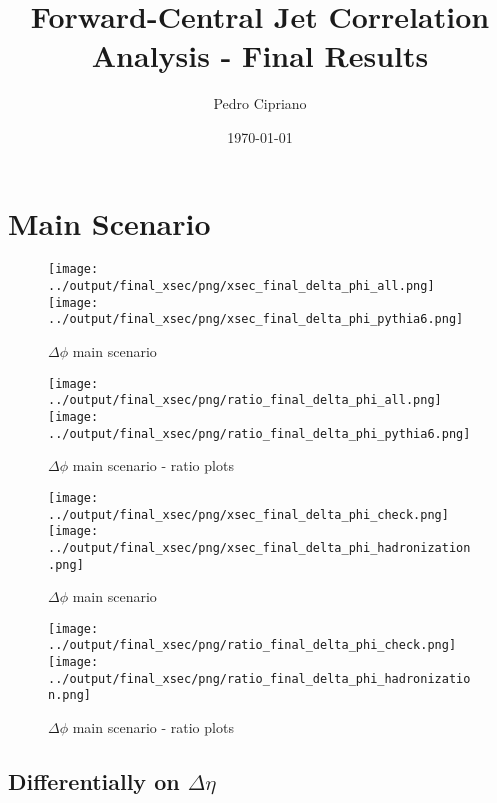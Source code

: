 \documentclass[11pt]{article}
\begin{document}
         
 
 \author{Pedro Cipriano}
 \date{\today}
 \title{Forward-Central Jet Correlation Analysis - Final Results}

\maketitle

\newpage
\section{Main Scenario}

\begin{figure}[ht]
\centering
\texttt{[image: ../output/final\_xsec/png/xsec\_final\_delta\_phi\_all.png]}
\texttt{[image: ../output/final\_xsec/png/xsec\_final\_delta\_phi\_pythia6.png]}
\caption{$\Delta\phi$ main scenario}
\label{fig:delta_phi}
\end{figure}

\begin{figure}[ht]
\centering
\texttt{[image: ../output/final\_xsec/png/ratio\_final\_delta\_phi\_all.png]}
\texttt{[image: ../output/final\_xsec/png/ratio\_final\_delta\_phi\_pythia6.png]}
\caption{$\Delta\phi$ main scenario - ratio plots}
\label{fig:delta_phi_ratio}
\end{figure}

\begin{figure}[ht]
\centering
\texttt{[image: ../output/final\_xsec/png/xsec\_final\_delta\_phi\_check.png]}
\texttt{[image: ../output/final\_xsec/png/xsec\_final\_delta\_phi\_hadronization.png]}
\caption{$\Delta\phi$ main scenario}
\label{fig:delta_phib}
\end{figure}

\begin{figure}[ht]
\centering
\texttt{[image: ../output/final\_xsec/png/ratio\_final\_delta\_phi\_check.png]}
\texttt{[image: ../output/final\_xsec/png/ratio\_final\_delta\_phi\_hadronization.png]}
\caption{$\Delta\phi$ main scenario - ratio plots}
\label{fig:delta_phib_ratio}
\end{figure}

\clearpage
\subsection{Differentially on $\Delta\eta$}
\end{document}
